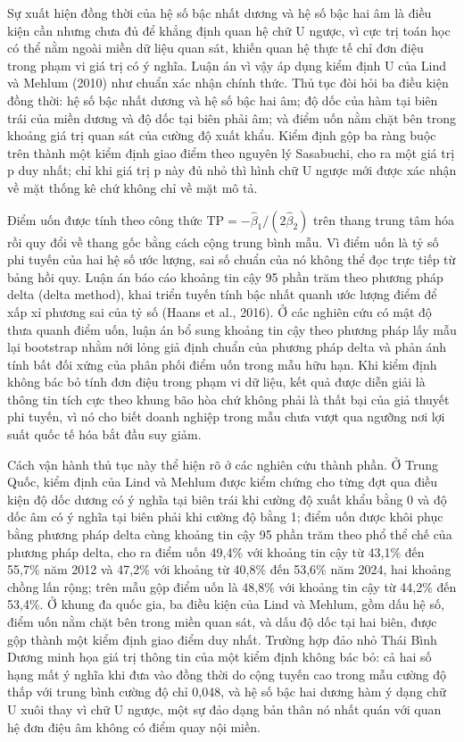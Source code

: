 \documentclass[
  a4paper,
  13pt]{extreport}
\begin{document}
Sự xuất hiện đồng thời của hệ số bậc nhất dương và hệ số bậc hai âm là
điều kiện cần nhưng chưa đủ để khẳng định quan hệ chữ U ngược, vì cực
trị toán học có thể nằm ngoài miền dữ liệu quan sát, khiến quan hệ thực
tế chỉ đơn điệu trong phạm vi giá trị có ý nghĩa. Luận án vì vậy áp dụng
kiểm định U của Lind và Mehlum (2010) như chuẩn xác nhận chính thức. Thủ
tục đòi hỏi ba điều kiện đồng thời: hệ số bậc nhất dương và hệ số bậc
hai âm; độ dốc của hàm tại biên trái của miền dương và độ dốc tại biên
phải âm; và điểm uốn nằm chặt bên trong khoảng giá trị quan sát của
cường độ xuất khẩu. Kiểm định gộp ba ràng buộc trên thành một kiểm định
giao điểm theo nguyên lý Sasabuchi, cho ra một giá trị p duy nhất; chỉ
khi giá trị p này đủ nhỏ thì hình chữ U ngược mới được xác nhận về mặt
thống kê chứ không chỉ về mặt mô tả.

Điểm uốn được tính theo công thức
\(\text{TP} = -\hat\beta_1 / (2\hat\beta_2)\) trên thang trung tâm hóa
rồi quy đổi về thang gốc bằng cách cộng trung bình mẫu. Vì điểm uốn là
tỷ số phi tuyến của hai hệ số ước lượng, sai số chuẩn của nó không thể
đọc trực tiếp từ bảng hồi quy. Luận án báo cáo khoảng tin cậy 95 phần
trăm theo phương pháp delta (delta method), khai triển tuyến tính bậc
nhất quanh ước lượng điểm để xấp xỉ phương sai của tỷ số (Haans et al.,
2016). Ở các nghiên cứu có mật độ thưa quanh điểm uốn, luận án bổ sung
khoảng tin cậy theo phương pháp lấy mẫu lại bootstrap nhằm nới lỏng giả
định chuẩn của phương pháp delta và phản ánh tính bất đối xứng của phân
phối điểm uốn trong mẫu hữu hạn. Khi kiểm định không bác bỏ tính đơn
điệu trong phạm vi dữ liệu, kết quả được diễn giải là thông tin tích cực
theo khung bão hòa chứ không phải là thất bại của giả thuyết phi tuyến,
vì nó cho biết doanh nghiệp trong mẫu chưa vượt qua ngưỡng nơi lợi suất
quốc tế hóa bắt đầu suy giảm.

Cách vận hành thủ tục này thể hiện rõ ở các nghiên cứu thành phần. Ở
Trung Quốc, kiểm định của Lind và Mehlum được kiểm chứng cho từng đợt
qua điều kiện độ dốc dương có ý nghĩa tại biên trái khi cường độ xuất
khẩu bằng 0 và độ dốc âm có ý nghĩa tại biên phải khi cường độ bằng 1;
điểm uốn được khôi phục bằng phương pháp delta cùng khoảng tin cậy 95
phần trăm theo phổ thể chế của phương pháp delta, cho ra điểm uốn 49,4\%
với khoảng tin cậy từ 43,1\% đến 55,7\% năm 2012 và 47,2\% với khoảng từ
40,8\% đến 53,6\% năm 2024, hai khoảng chồng lấn rộng; trên mẫu gộp điểm
uốn là 48,8\% với khoảng tin cậy từ 44,2\% đến 53,4\%. Ở khung đa quốc
gia, ba điều kiện của Lind và Mehlum, gồm dấu hệ số, điểm uốn nằm chặt
bên trong miền quan sát, và dấu độ dốc tại hai biên, được gộp thành một
kiểm định giao điểm duy nhất. Trường hợp đảo nhỏ Thái Bình Dương minh
họa giá trị thông tin của một kiểm định không bác bỏ: cả hai số hạng mất
ý nghĩa khi đưa vào đồng thời do cộng tuyến cao trong mẫu cường độ thấp
với trung bình cường độ chỉ 0,048, và hệ số bậc hai dương hàm ý dạng chữ
U xuôi thay vì chữ U ngược, một sự đảo dạng bản thân nó nhất quán với
quan hệ đơn điệu âm không có điểm quay nội miền.
\end{document}
